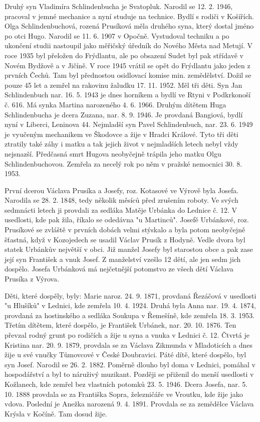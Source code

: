 \documentclass[../dejiny-rodu-prusiku.tex]{subfiles}
\begin{document}
Druhý syn Vladimíra Schlindenbucha je Svatopluk. Narodil se 12. 2. 1946,  pracoval v jemné mechanice a nyní studuje na technice. Bydlí s rodiči v Košířích. Olga Schlindenbuchová, rozená Prusíková měla druhého syna, který dostal jméno po otci Hugo. Narodil se 11. 6. 1907 v Opočně. Vystudoval techniku a po ukončení studii nastoupil jako měřičský úředník do Nového Města nad Metují. V roce 1935 byl přeložen do Frýdlantu, ale po obsazení Sudet byl pak střídavě v Novém Bydžově a v Jičíně. V roce 1945 vrátil se opět do Frýdlantu jako jeden z prvních Čechů. Tam byl přednostou osidlovací komise min. zemědělství. Dožil se pouze 45 let a zemřel na rakovinu žaludku 17. 11. 1952. Měl tři děti. Syn Jan Schlindenbuch nar. 16. 5. 1943 je dnes horníkem a bydlí ve Rtyni v Podkrkonoší č. 616. Má synka Martina naroze­ného 4. 6. 1966. Druhým dítětem Huga Schlindenbucha je dcera Zuzana, nar. 8. 9. 1946. Je provdaná Bangiová, bydlí nyní v Liberci, Leninova 44. Nejmladší syn Pavel Schlindenbuch, nar. 23. 6. 1949 je vyučeným mechanikem ve Škodovce a žije v Hradci Králové. Tyto tři děti ztratily také záhy i matku a tak jejich život v nejmladších letech nebyl vždy nejsnazší. Předčasná smrt Hugova neobyčejně trápila jeho matku Olgu Schlindenbuchovou. Zemřela za necelý rok po něm v pražské nemocnici 30. 8. 1953.

První dcerou Václava Prusíka a Josefy, roz. Kotasové ve Výrově byla Josefa. Narodila se 28. 2. 1848, tedy několik měsíců před zrušením roboty. Ve svých sedmnácti letech ji provdali za sedláka Matěje Urbánka do Lednice č. 12. V usedlosti, kde pak žila, říkalo se odedávna "u Martinců". Josefě Urbánkové, roz. Prusíkové se zvláště v prvních dobách velmi stýskalo a byla potom neobyčejně šťastná, když v Kozojedech se usadil Václav Prusík z Hodyně. Vedle dvora byl statek Urbánkův největší v obci. Již manžel Josefy byl starostou obce a pak zase její syn František a vnuk Josef. Z manželství vzešlo 12 dětí, ale jen sedm jich dospělo. Josefa Urbánková má nejčetnější potomstvo ze všech dětí Václava Prusíka z Výrova.

Děti, které dospěly, byly: Marie naroz. 24. 9. 1871, provdaná Řezáčová v usedlosti "u Hlušíků" v Lednici, kde zemře­la 10. 4. 1924. Druhá byla Anna nar. 19. 4. 1874, provdaná za hostinského a sedláka Soukupa v Řemešíně, kde zemřela 18. 3. 1953. Třetím dítětem, které dospělo, je František Urbánek, nar. 20. 10. 1876. Ten převzal rodný grunt po ro­dičích a žije u syna a vnuka v Lednici č. 12. Čtvrtá je Kristina nar. 20. 9. 1879, provdala se za Václava Zikmunda v Mladoticích a dnes žije u své vnučky Tůmovcové v České Doubravici. Páté dítě, které dospělo, byl syn Josef. Narodil se 26. 2. 1882. Poměrně dlouho byl doma v Lednici, pomáhal v hospodářství a byl to náruživý muzikant. Pozdě­ji se přiženil do menší usedlosti v Kožlanech, kde zemřel bez vlastních potomků 23. 5. 1946. Dcera Josefa, nar. 5. 10. 1888 provdala se za Františka Sopra, železničáře ve Vroutku,
kde žije jako vdova. Poslední je Anežka naro­zená 9. 4. 1891. Provdala se za zemědělce Václava Krýsla v Kočíně. Tam dosud žije.
\end{document}
